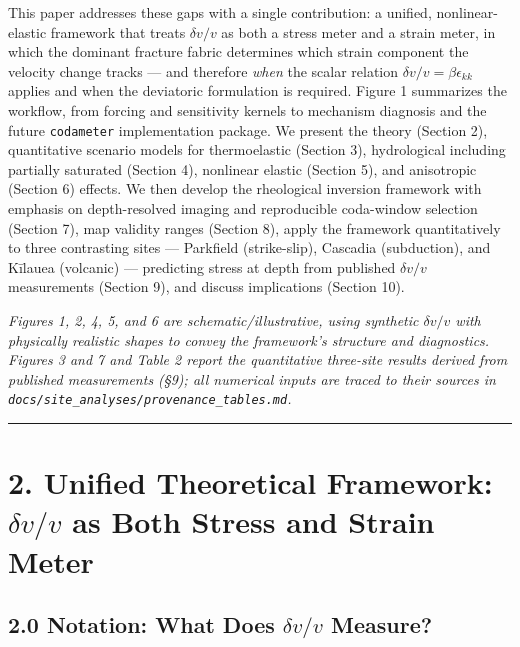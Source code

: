 \documentclass[draft]{agujournal2019}
\begin{document}
This paper addresses these gaps with a single contribution: a unified,
nonlinear-elastic framework that treats \(\delta v/v\) as both a stress
meter and a strain meter, in which the dominant fracture fabric
determines which strain component the velocity change tracks --- and
therefore \emph{when} the scalar relation
\(\delta v/v = \beta\epsilon_{kk}\) applies and when the deviatoric
formulation is required. Figure 1 summarizes the workflow, from forcing
and sensitivity kernels to mechanism diagnosis and the future
\texttt{codameter} implementation package. We present the theory
(Section 2), quantitative scenario models for thermoelastic (Section 3),
hydrological including partially saturated (Section 4), nonlinear
elastic (Section 5), and anisotropic (Section 6) effects. We then
develop the rheological inversion framework with emphasis on
depth-resolved imaging and reproducible coda-window selection (Section
7), map validity ranges (Section 8), apply the framework quantitatively
to three contrasting sites --- Parkfield (strike-slip), Cascadia
(subduction), and Kīlauea (volcanic) --- predicting stress at depth from
published \(\delta v/v\) measurements (Section 9), and discuss
implications (Section 10).

\emph{Figures 1, 2, 4, 5, and 6 are schematic/illustrative, using
synthetic \(\delta v/v\) with physically realistic shapes to convey the
framework's structure and diagnostics. Figures 3 and 7 and Table 2
report the quantitative three-site results derived from published
measurements (§9); all numerical inputs are traced to their sources in
\texttt{docs/site\_analyses/provenance\_tables.md}.}

\begin{center}\rule{0.5\linewidth}{0.5pt}\end{center}

\section{\texorpdfstring{2. Unified Theoretical Framework:
\(\delta v/v\) as Both Stress and Strain
Meter}{2. Unified Theoretical Framework: \textbackslash delta v/v as Both Stress and Strain Meter}}\label{unified-theoretical-framework-delta-vv-as-both-stress-and-strain-meter}

\subsection{\texorpdfstring{2.0 Notation: What Does \(\delta v/v\)
Measure?}{2.0 Notation: What Does \textbackslash delta v/v Measure?}}\label{notation-what-does-delta-vv-measure}
\end{document}
